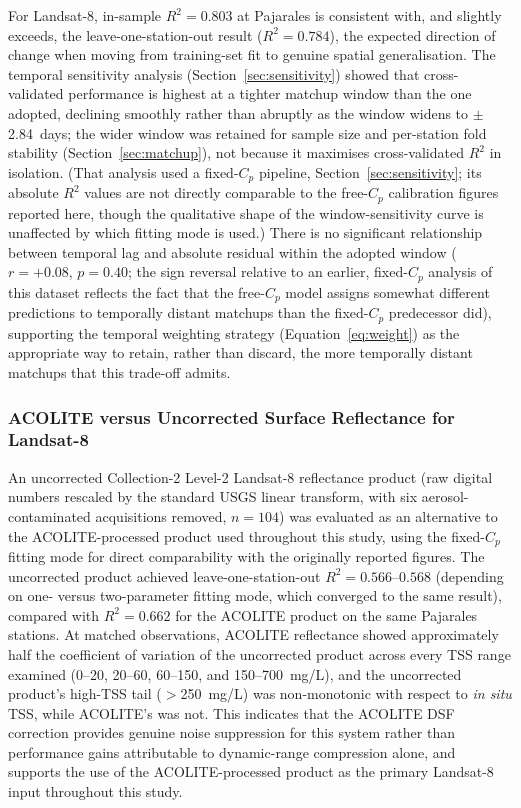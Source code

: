 \documentclass[remotesensing,article,submit,pdftex,moreauthors]{Definitions/mdpi}
\begin{document}
For Landsat-8, in-sample $R^2 = 0.803$ at Pajarales is consistent with,
and slightly exceeds, the leave-one-station-out result
($R^2 = 0.784$), the expected direction of change when moving from
training-set fit to genuine spatial generalisation. The temporal
sensitivity analysis (Section~\ref{sec:sensitivity}) showed that
cross-validated performance is highest at a tighter matchup window
than the one adopted, declining smoothly rather than abruptly as the
window widens to $\pm$2.84~days; the wider window was retained for
sample size and per-station fold stability (Section~\ref{sec:matchup}),
not because it maximises cross-validated $R^2$ in isolation. (That
analysis used a fixed-$C_p$ pipeline, Section~\ref{sec:sensitivity};
its absolute $R^2$ values are not directly comparable to the free-$C_p$
calibration figures reported here, though the qualitative shape of the
window-sensitivity curve is unaffected by which fitting mode is used.)
There is
no significant relationship between temporal lag and absolute residual
within the adopted window ($r = +0.08$, $p = 0.40$; the sign
reversal relative to an earlier, fixed-$C_p$ analysis of this dataset
reflects the fact that the free-$C_p$ model assigns somewhat different
predictions to temporally distant matchups than the fixed-$C_p$
predecessor did), supporting the
temporal weighting strategy (Equation~\ref{eq:weight}) as the
appropriate way to retain, rather than discard, the more temporally
distant matchups that this trade-off admits.
 
\subsubsection{ACOLITE versus Uncorrected Surface Reflectance for Landsat-8}
\label{sec:disc_acolite_vs_raw}
 
An uncorrected Collection-2 Level-2 Landsat-8 reflectance product (raw
digital numbers rescaled by the standard USGS linear transform, with
six aerosol-contaminated acquisitions removed, $n=104$) was evaluated
as an alternative to the ACOLITE-processed product used throughout this
study, using the fixed-$C_p$ fitting mode for direct comparability with
the originally reported figures. The uncorrected product achieved leave-one-station-out
$R^2 = 0.566$--$0.568$ (depending on one- versus two-parameter fitting
mode, which converged to the same result), compared with $R^2 = 0.662$
for the ACOLITE product on the same Pajarales stations. At matched
observations, ACOLITE reflectance showed approximately half the
coefficient of variation of the uncorrected product across every TSS
range examined (0--20, 20--60, 60--150, and 150--700~mg/L), and the
uncorrected product's high-TSS tail ($>$250~mg/L) was non-monotonic
with respect to \textit{in situ} TSS, while ACOLITE's was not. This
indicates that the ACOLITE DSF correction provides genuine noise
suppression for this system rather than performance gains attributable
to dynamic-range compression alone, and supports the use of the
ACOLITE-processed product as the primary Landsat-8 input throughout
this study.
 
\end{document}
